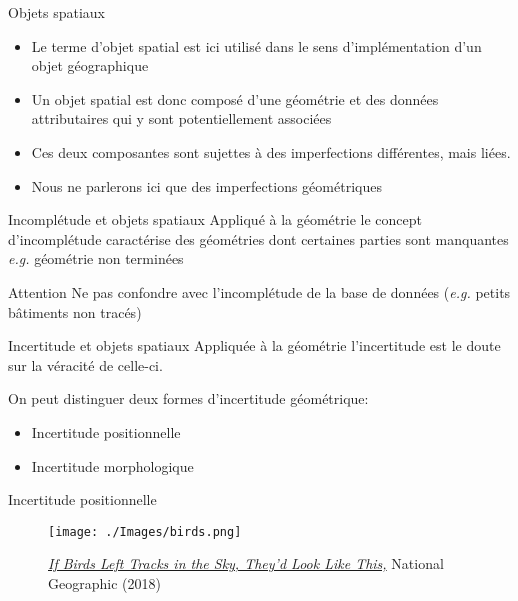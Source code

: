 \documentclass{beamer}
\begin{document}
\begin{frame}{Objets spatiaux}
	\begin{itemize}
		\item Le terme \alert{d'objet spatial} est ici utilisé dans le sens d'implémentation d'un \alert{objet géographique}
		\item Un \alert{objet spatial} est donc composé d'une \alert{géométrie} et des \alert{données attributaires} qui y sont potentiellement associées
		\item Ces deux composantes sont sujettes à des imperfections différentes, mais \alert{liées.}
		\item Nous ne parlerons ici que des \alert{imperfections géométriques}
	\end{itemize}
\end{frame}

\begin{frame}{Incomplétude et objets spatiaux}
Appliqué à la géométrie le concept d'incomplétude caractérise des géométries dont certaines parties sont manquantes
{\small \emph{e.g.} géométrie non terminées}

 \begin{alertblock}{Attention}
	Ne pas confondre avec l'incomplétude de la base de données (\emph{e.g.} petits bâtiments non tracés)
 \end{alertblock}

\end{frame}

\begin{frame}{Incertitude et objets spatiaux}
Appliquée à la géométrie l'incertitude est le doute sur la véracité de celle-ci.

On peut distinguer deux formes d'incertitude géométrique:
	\begin{itemize}
		\item \alert{Incertitude positionnelle} \\
		\item \alert{Incertitude morphologique} \\
	\end{itemize}  
\end{frame}

\begin{frame}{Incertitude positionnelle}
\begin{figure}
		\centering
		\texttt{[image: ./Images/birds.png]}
		\caption{\href{https://www.nationalgeographic.com/magazine/2018/01/photo-journal-birds-paths-migration-starling/}{\emph{If Birds Left Tracks in the Sky, They’d Look Like This,}} National Geographic (2018)}
	\end{figure}
\end{frame}
\end{document}
